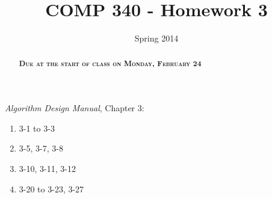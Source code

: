 \documentclass[]{tufte-handout}
\title{COMP 340 - Homework 3}
\date{Spring 2014}
\begin{document}
\maketitle

\begin{abstract}
\textsc{\textbf{Due at the start of class on Monday, February 24}}
\end{abstract}

\textit{Algorithm Design Manual}, Chapter 3:
\begin{enumerate}
\item 3-1 to 3-3
\item 3-5, 3-7, 3-8
\item 3-10, 3-11, 3-12
\item 3-20 to 3-23, 3-27
\end{enumerate}
\end{document}
